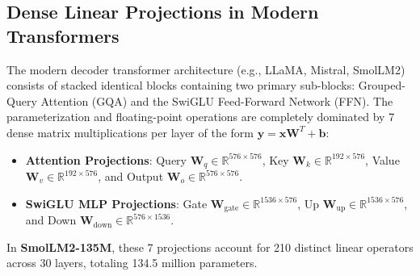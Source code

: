 \documentclass[11pt,a4paper]{article}
\begin{document}
\subsection{Dense Linear Projections in Modern Transformers}
The modern decoder transformer architecture (e.g., LLaMA, Mistral, SmolLM2) consists of stacked identical blocks containing two primary sub-blocks: Grouped-Query Attention (GQA) and the SwiGLU Feed-Forward Network (FFN). The parameterization and floating-point operations are completely dominated by 7 dense matrix multiplications per layer of the form $\mathbf{y} = \mathbf{x}\mathbf{W}^T + \mathbf{b}$:
\begin{itemize}
    \item \textbf{Attention Projections}: Query $\mathbf{W}_q \in \mathbb{R}^{576 \times 576}$, Key $\mathbf{W}_k \in \mathbb{R}^{192 \times 576}$, Value $\mathbf{W}_v \in \mathbb{R}^{192 \times 576}$, and Output $\mathbf{W}_o \in \mathbb{R}^{576 \times 576}$.
    \item \textbf{SwiGLU MLP Projections}: Gate $\mathbf{W}_{\text{gate}} \in \mathbb{R}^{1536 \times 576}$, Up $\mathbf{W}_{\text{up}} \in \mathbb{R}^{1536 \times 576}$, and Down $\mathbf{W}_{\text{down}} \in \mathbb{R}^{576 \times 1536}$.
\end{itemize}
In \textbf{SmolLM2-135M}, these 7 projections account for 210 distinct linear operators across 30 layers, totaling 134.5 million parameters.
\end{document}
